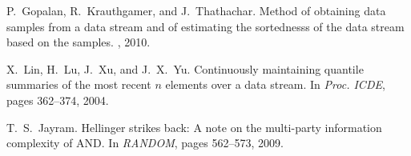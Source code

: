 \documentclass{llncs}
\begin{document}
{\begin{thebibliography}{10}
P.~Gopalan, R.~Krauthgamer, and J.~Thathachar.
\newblock Method of obtaining data samples from a data stream and of estimating
  the sortednesss of the data stream based on the samples.
, 2010.

X.~Lin, H.~Lu, J.~Xu, and J.~X.~Yu.
\newblock Continuously maintaining quantile summaries of the most recent $n$
  elements over a data stream.
\newblock In {\em Proc. ICDE}, pages 362--374, 2004.

T.~S.~Jayram.
\newblock Hellinger strikes back: A note on the multi-party information
complexity of AND.
\newblock In {\em RANDOM}, pages 562--573, 2009.
\end{thebibliography}
}
\end{document}
